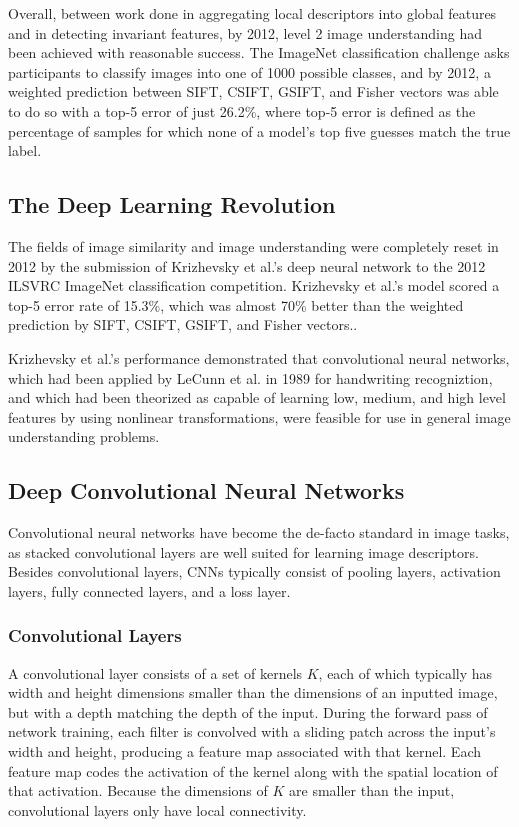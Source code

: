 Overall, between work done in aggregating local descriptors into global features and in detecting invariant features, by 2012, level 2 image understanding had been achieved with reasonable success. The ImageNet classification challenge asks participants to classify images into one of 1000 possible classes, and by 2012, a weighted prediction between SIFT, CSIFT, GSIFT, and Fisher vectors was able to do so with a top-5 error of just 26.2\%, where top-5 error is defined as the percentage of samples for which none of a model's top five guesses match the true label.\cite{russakovsky2015imagenet}

\subsection{The Deep Learning Revolution}
The fields of image similarity and image understanding were completely reset in 2012 by the submission of Krizhevsky et al.'s deep neural network to the 2012 ILSVRC ImageNet classification competition. Krizhevsky et al.'s model scored a top-5 error rate of 15.3\%, which was almost 70\% better than the weighted prediction by SIFT, CSIFT, GSIFT, and Fisher vectors.\cite{krizhevsky2012imagenet}.

Krizhevsky et al.'s performance demonstrated that convolutional neural networks, which had been applied by LeCunn et al. in 1989 for handwriting recogniztion, and which had been theorized as capable of learning low, medium, and high level features by using nonlinear transformations, were feasible for use in general image understanding problems.\cite{lecun1989backpropagation}


\subsection{Deep Convolutional Neural Networks}
Convolutional neural networks have become the de-facto standard in image tasks, as stacked convolutional layers are well suited for learning image descriptors.\cite{karpathy2014large}\cite{krizhevsky2012imagenet}\cite{szegedy2015going} Besides convolutional layers, CNNs typically consist of pooling layers, activation layers, fully connected layers, and a loss layer. 

\subsubsection{Convolutional Layers}
A convolutional layer consists of a set of kernels $K$, each of which typically has width and height dimensions smaller than the dimensions of an inputted image, but with a depth matching the depth of the input. During the forward pass of network training, each filter is convolved with a sliding patch across the input's width and height, producing a feature map associated with that kernel. Each feature map codes the activation of the kernel along with the spatial location of that activation. Because the dimensions of $K$ are smaller than the input, convolutional layers only have local connectivity.

